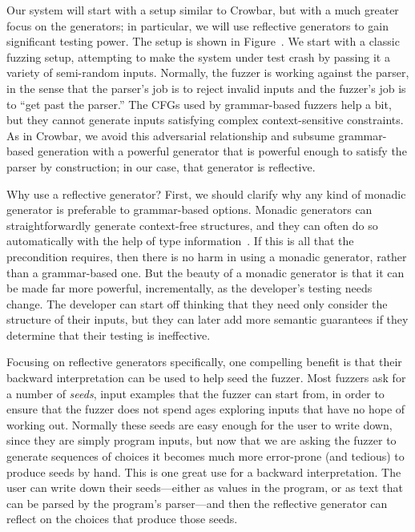 Our system will start with a setup similar to Crowbar, but with a much greater
focus on the generators; in particular, we will use reflective generators to
gain significant testing power. The setup is shown in
Figure~. We start with a classic fuzzing setup, attempting
to make the system under test crash by passing it a variety of semi-random
inputs. Normally, the fuzzer is working against the parser, in the sense that
the parser's job is to reject invalid inputs and the fuzzer's job is to ``get
past the parser.'' The CFGs used by grammar-based fuzzers help a bit, but they
cannot generate inputs satisfying complex context-sensitive constraints. As in
Crowbar, we avoid this adversarial relationship and subsume grammar-based
generation with a powerful generator that is powerful enough to satisfy the
parser by construction; in our case, that generator is reflective.

Why use a reflective generator? First, we should clarify why any kind of monadic
generator is preferable to grammar-based options. Monadic generators can
straightforwardly generate context-free structures, and they can often do so
automatically with the help of type information~\cite{mista2019deriving}. If
this is all that the precondition requires, then there is no harm in using a
monadic generator, rather than a grammar-based one. But the beauty of a monadic
generator is that it can be made far more powerful, incrementally, as the
developer's testing needs change. The developer can start off thinking that they
need only consider the structure of their inputs, but they can later add more
semantic guarantees if they determine that their testing is ineffective.

Focusing on reflective generators specifically, one compelling benefit is that
their backward interpretation can be used to help seed the fuzzer.  Most fuzzers
ask for a number of {\em seeds}, input examples that the fuzzer can start from,
in order to ensure that the fuzzer does not spend ages exploring
inputs that have no hope of working out. Normally these seeds are easy enough
for the user to write down, since they are simply program inputs, but now that
we are asking the fuzzer to generate sequences of choices it becomes much more
error-prone (and tedious) to produce seeds by hand.  This is one great use for a
backward interpretation. The user can write down their seeds---either as values
in the program, or as text that can be parsed by the program's parser---and then
the reflective generator can reflect on the choices that produce those seeds.

